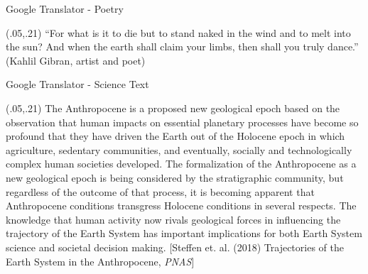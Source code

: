 \documentclass{beamer}
\begin{document}
\begin{frame} {Google Translator - Poetry}
\begin{textblock}{1}(.05,.21)
  \normalsize {\enquote{For what is it to die but to stand naked in the wind and to melt into the sun? And when the earth shall claim your limbs, then shall you truly dance.} (Kahlil Gibran, artist and poet)}
\end{textblock}


\end{frame}

\begin{frame} {Google Translator - Science Text}
\begin{textblock}{1}(.05,.21)
  \footnotesize {The Anthropocene is a proposed new geological epoch based on the observation that human impacts on essential planetary processes have become so profound that they have driven the Earth out of the Holocene epoch in which agriculture, sedentary communities, and eventually, socially and technologically complex human societies developed. The formalization of the Anthropocene as a new geological epoch is being considered by the stratigraphic community, but regardless of the outcome of that process, it is becoming apparent that Anthropocene conditions transgress Holocene conditions in several respects. The knowledge that human activity now rivals geological forces in influencing the trajectory of the Earth System has important implications for both Earth System science and societal decision making. [Steffen et. al. (2018) Trajectories of the Earth System in the Anthropocene, \textit{PNAS}]}
\end{textblock}

\end{frame}
\end{document}
